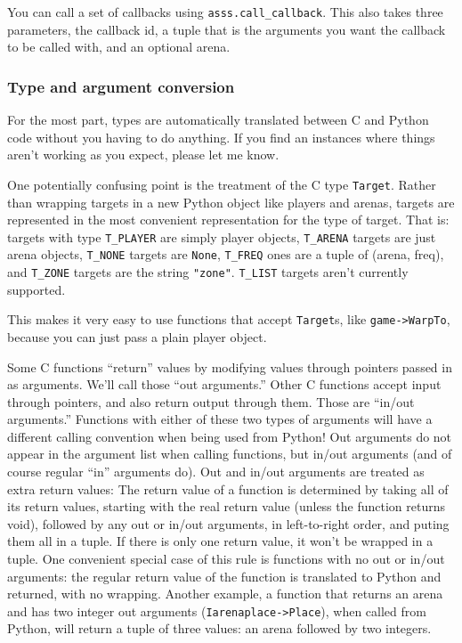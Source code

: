 \documentclass{article}
\begin{document}
You can call a set of callbacks using \verb/asss.call_callback/. This
also takes three parameters, the callback id, a tuple that is the
arguments you want the callback to be called with, and an optional
arena.


\subsubsection{Type and argument conversion}

For the most part, types are automatically translated between C and
Python code without you having to do anything. If you find an instances
where things aren't working as you expect, please let me know.

One potentially confusing point is the treatment of the C type
\verb/Target/. Rather than wrapping targets in a new Python object like
players and arenas, targets are represented in the most convenient
representation for the type of target. That is: targets with type
\verb/T_PLAYER/ are simply player objects, \verb/T_ARENA/ targets are
just arena objects, \verb/T_NONE/ targets are \verb/None/, \verb/T_FREQ/
ones are a tuple of (arena, freq), and \verb/T_ZONE/ targets are the
string \verb/"zone"/. \verb/T_LIST/ targets aren't currently supported.

This makes it very easy to use functions that accept \verb/Target/s,
like \verb/game->WarpTo/, because you can just pass a plain player
object.

Some C functions ``return'' values by modifying values through pointers
passed in as arguments. We'll call those ``out arguments.'' Other C
functions accept input through pointers, and also return output through
them. Those are ``in/out arguments.'' Functions with either of these two
types of arguments will have a different calling convention when being
used from Python! Out arguments do not appear in the argument list when
calling functions, but in/out arguments (and of course regular ``in''
arguments do). Out and in/out arguments are treated as extra return
values: The return value of a function is determined by taking all of
its return values, starting with the real return value (unless the
function returns void), followed by any out or in/out arguments, in
left-to-right order, and puting them all in a tuple. If there is only
one return value, it won't be wrapped in a tuple. One convenient special
case of this rule is functions with no out or in/out arguments: the
regular return value of the function is translated to Python and
returned, with no wrapping. Another example, a function that returns an
arena and has two integer out arguments (\verb/Iarenaplace->Place/),
when called from Python, will return a tuple of three values: an arena
followed by two integers.
\end{document}
